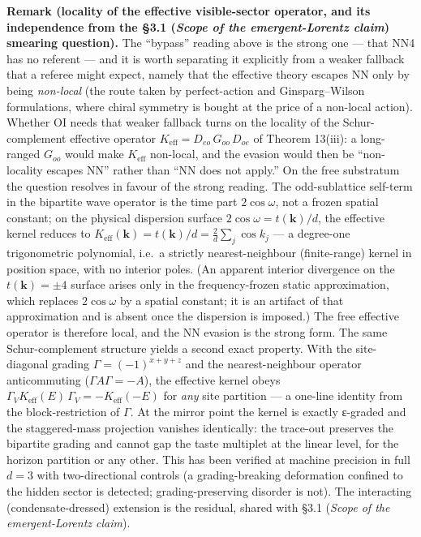 \documentclass[
]{article}
\begin{document}
\textbf{Remark (locality of the effective visible-sector operator, and
its independence from the §3.1 (\emph{Scope of the emergent-Lorentz
claim}) smearing question).} The ``bypass'' reading above is the strong
one --- that NN4 has no referent --- and it is worth separating it
explicitly from a weaker fallback that a referee might expect, namely
that the effective theory escapes NN only by being \emph{non-local} (the
route taken by perfect-action and Ginsparg--Wilson formulations, where
chiral symmetry is bought at the price of a non-local action). Whether
OI needs that weaker fallback turns on the locality of the
Schur-complement effective operator
\(K_{\text{eff}} = D_{eo}\,G_{oo}\,D_{oe}\) of Theorem 13(iii): a
long-ranged \(G_{oo}\) would make \(K_{\text{eff}}\) non-local, and the
evasion would then be ``non-locality escapes NN'' rather than ``NN does
not apply.'' On the free substratum the question resolves in favour of
the strong reading. The odd-sublattice self-term in the bipartite wave
operator is the time part \(2\cos\omega\), not a frozen spatial
constant; on the physical dispersion surface
\(2\cos\omega = t(\mathbf{k})/d\), the effective kernel reduces to
\(K_{\text{eff}}(\mathbf{k}) = t(\mathbf{k})/d = \tfrac{2}{d}\sum_j\cos k_j\)
--- a degree-one trigonometric polynomial, i.e.~a strictly
nearest-neighbour (finite-range) kernel in position space, with no
interior poles. (An apparent interior divergence on the
\(t(\mathbf{k})=\pm 4\) surface arises only in the frequency-frozen
static approximation, which replaces \(2\cos\omega\) by a spatial
constant; it is an artifact of that approximation and is absent once the
dispersion is imposed.) The free effective operator is therefore local,
and the NN evasion is the strong form. The same Schur-complement
structure yields a second exact property. With the site-diagonal grading
\(\Gamma = (-1)^{x+y+z}\) and the nearest-neighbour operator
anticommuting (\(\Gamma A \Gamma = -A\)), the effective kernel obeys
\(\Gamma_V K_{\text{eff}}(E)\,\Gamma_V = -K_{\text{eff}}(-E)\) for
\emph{any} site partition --- a one-line identity from the
block-restriction of \(\Gamma\). At the mirror point the kernel is
exactly ε-graded and the staggered-mass projection vanishes identically:
the trace-out preserves the bipartite grading and cannot gap the taste
multiplet at the linear level, for the horizon partition or any other.
This has been verified at machine precision in full \(d=3\) with
two-directional controls (a grading-breaking deformation confined to the
hidden sector is detected; grading-preserving disorder is not). The
interacting (condensate-dressed) extension is the residual, shared with
§3.1 (\emph{Scope of the emergent-Lorentz claim}).
\end{document}
